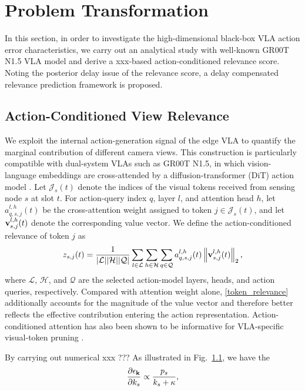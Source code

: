 \documentclass[lettersize,journal]{IEEEtran}
\theoremstyle{custom}
\begin{document}
\section{Problem Transformation}
In this section, in order to investigate the high-dimensional black-box VLA action error characteristics, we carry out an analytical study with well-known GR00T N1.5 VLA model \cite{nvidia_gr00t_2025} and derive a xxx-based action-conditioned relevance score. Noting the posterior delay issue of the relevance score, a delay compensated relevance prediction framework is proposed. 

\subsection{Action-Conditioned View Relevance}
We exploit the internal action-generation signal of the edge VLA to quantify the marginal contribution of different camera views. This construction is particularly compatible with dual-system VLAs such as GR00T N1.5, in which vision-language embeddings are cross-attended by a diffusion-transformer (DiT) action model \cite{nvidia_gr00t_2025}. Let $\mathcal{J}_s(t)$ denote the indices of the visual tokens received from sensing node $s$ at slot $t$. For action-query index $q$, layer $l$, and attention head $h$, let $a_{q,s,j}^{l,h}(t)$ be the cross-attention weight assigned to token $j\in\mathcal{J}_s(t)$, and let ${\bf v}_{s,j}^{l,h}(t)$ denote the corresponding value vector. We define the action-conditioned relevance of token $j$ as
\begin{align}
    z_{s,j}(t)
    = \frac{1}{|\mathcal{L}||\mathcal{H}||\mathcal{Q}|}
    \sum_{l\in\mathcal{L}}\sum_{h\in\mathcal{H}}\sum_{q\in\mathcal{Q}}
    a_{q,s,j}^{l,h}(t)\left\|{\bf v}_{s,j}^{l,h}(t)\right\|_2,
    \label{token_relevance}
\end{align}
where $\mathcal{L}$, $\mathcal{H}$, and $\mathcal{Q}$ are the selected action-model layers, heads, and action queries, respectively. Compared with attention weight alone, \eqref{token_relevance} additionally accounts for the magnitude of the value vector and therefore better reflects the effective contribution entering the action representation. Action-conditioned attention has also been shown to be informative for VLA-specific visual-token pruning \cite{liu_vlapruner_2025}.

By carrying out numerical xxx ??? As illustrated in Fig.~\ref{}, we have the 
\begin{align}
    \frac{\partial \epsilon_{\bf k}}{\partial k_s} \propto \frac{p_s}{k_s + \kappa}, 
\end{align}
\end{document}
